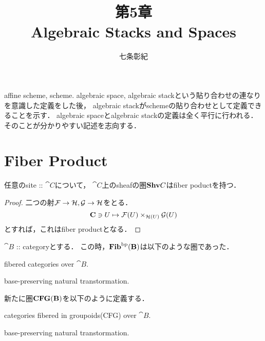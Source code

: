 \documentclass[a4paper, dvipdfmx]{jsarticle}
\begin{document}
\title{第5章 \\ Algebraic Stacks and Spaces}
\author{七条彰紀}
\maketitle
\tableofcontents
\vspace{10pt}

affine scheme, scheme. algebraic space, algebraic stackという貼り合わせの連なりを意識した定義をした後，
algebraic stackがschemeの貼り合わせとして定義できることを示す．
algebraic spaceとalgebraic stackの定義は全く平行に行われる．
そのことが分かりやすい記述を志向する．

\section{Fiber Product}
\begin{Prop}
    任意のsite :: $\cat{C}$について，
    $\cat{C}$上のsheafの圏$\mathbf{Shv}{C}$はfiber poductを持つ．
\end{Prop}
\begin{proof}
    二つの射$\mathcal{F} \to \mathcal{H}, \mathcal{G} \to \mathcal{H}$をとる．
    \[ \mathbf{C} \ni U \mapsto \mathcal{F}(U) \times_{\mathcal{H}(U)} \mathcal{G}(U) \]
    とすれば，これはfiber productとなる．
\end{proof}

$\cat{B}$ :: categoryとする．
この時，$\mathbf{Fib}^{\mathrm{bp}}(\mathbf{B})$は以下のような圏であった．
\begin{description}[labelindent=1cm]
    \item[Objects:] fibered categories over $\cat{B}$.
    \item[Arrows:]  base-preserving natural transtormation.
\end{description}
新たに圏$\mathbf{CFG}(\mathbf{B})$を以下のように定義する．
\begin{description}[labelindent=1cm]
    \item[Objects:] categories fibered in groupoids(CFG) over $\cat{B}$.
    \item[Arrows:] base-preserving natural transtormation.
\end{description}
\end{document}
